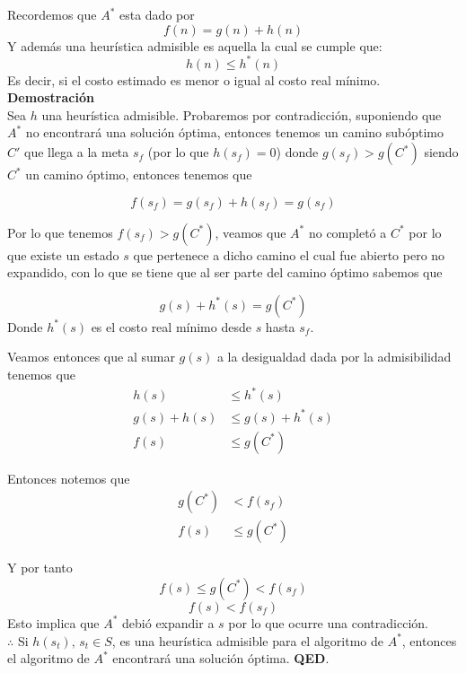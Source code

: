 Recordemos que $A^*$ esta dado por
\[f(n)=g(n)+h(n)\]
Y además una heurística admisible es aquella la cual se cumple que:
\[h(n) \leq h^*(n)\]
Es decir, si el costo estimado es menor o igual al costo real mínimo.\\
\textbf{Demostración}\\
Sea $h$ una heurística admisible.  Probaremos por contradicción, suponiendo que $A^*$ no encontrará una solución óptima, entonces tenemos un camino subóptimo $C'$ que llega a la meta $s_f$ (por lo que $h(s_f)=0$) donde $g(s_f) > g(C^*)$ siendo $C^*$ un camino óptimo, entonces tenemos que

\[ f(s_f)= g(s_f) + h(s_f) = g(s_f) \]

Por lo que tenemos $f(s_f) > g (C^*)$, veamos que $A^*$ no completó a $C^*$ por lo que existe un estado $s$ que pertenece a dicho camino el cual fue abierto pero no expandido, con lo que se tiene que al ser parte del camino óptimo sabemos que

\[ g(s)+h^*(s) = g(C^*) \]
Donde $h^*(s)$ es el costo real mínimo desde $s$ hasta $s_f$.

Veamos entonces que al sumar $g(s)$ a la desigualdad dada por la admisibilidad tenemos que
\begin{align*}
    h(s) & \leq h^*(s)\\
    g(s) + h(s) & \leq g(s) + h^*(s)\\
    f(s) & \leq g(C^*)
\end{align*}

Entonces notemos que 
\begin{align*}
    g(C^*) & < f(s_f)\\
    f(s) & \leq g(C^*) 
\end{align*}

Y por tanto
\[f(s) \leq g(C^*) < f(s_f)\]
\[f(s) < f(s_f) \]
Esto implica que $A^*$ debió expandir a $s$ por lo que ocurre una contradicción.\\
$\therefore$ Si $h(s_t),\, s_t \in S$, es una heurística admisible para el algoritmo de $A^*$, entonces el algoritmo de $A^*$ encontrará una solución óptima. \textbf{QED}. 
 
